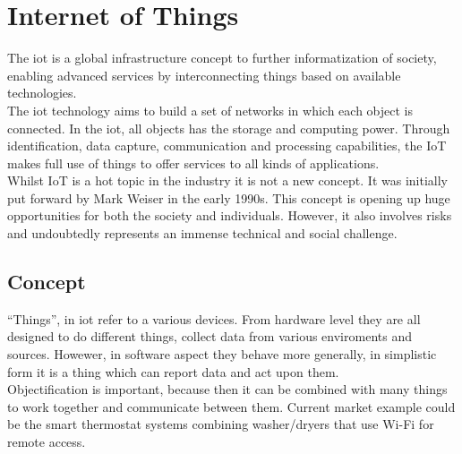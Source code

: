 \section{Internet of Things} 
The \gls{iot} is a global infrastructure concept to further informatization of society, enabling advanced services by interconnecting things based on available technologies.\\The \gls{iot} technology aims to build a set of networks in which each object is connected. In the \gls{iot}, all objects has the storage and computing power.\cite{7263548} Through identification, data capture, communication and processing capabilities, the IoT makes full use of things to offer services to all kinds of applications. \\Whilst IoT is a hot topic in the industry it is not a new concept. It was initially put forward by Mark Weiser in the early 1990s. This concept is opening up huge opportunities for both the society and individuals. However, it also involves risks and undoubtedly represents an immense technical and social challenge.\cite{iot}
\subsection{Concept} %
\label{sub:concept}
``Things'', in \gls{iot} refer to a various devices. From hardware level they are all designed to do different things, collect data from various enviroments and sources. Howewer, in software aspect they behave more generally, in simplistic form it is a thing which can report data and act upon them. \\Objectification is important, because then it can be combined with many things to work together and communicate between them. Current market example could be the smart thermostat systems combining washer/dryers that use Wi-Fi for remote access.
